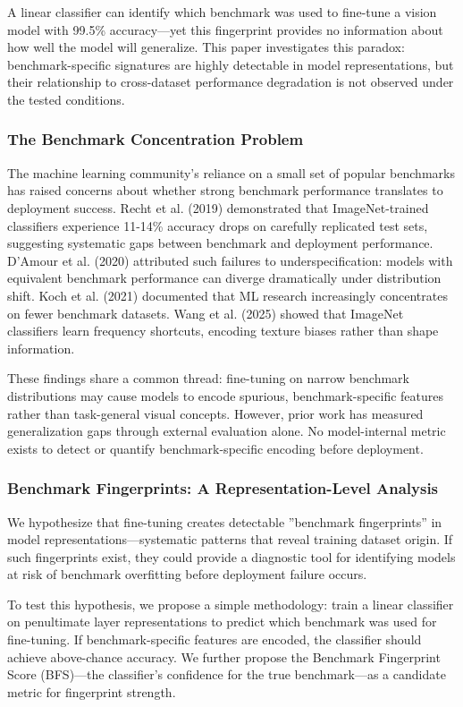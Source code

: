 
A linear classifier can identify which benchmark was used to fine-tune a vision model with 99.5\% accuracy---yet this fingerprint provides no information about how well the model will generalize. This paper investigates this paradox: benchmark-specific signatures are highly detectable in model representations, but their relationship to cross-dataset performance degradation is not observed under the tested conditions.

\subsubsection{The Benchmark Concentration Problem}

The machine learning community's reliance on a small set of popular benchmarks has raised concerns about whether strong benchmark performance translates to deployment success. Recht et al. (2019) demonstrated that ImageNet-trained classifiers experience 11-14\% accuracy drops on carefully replicated test sets, suggesting systematic gaps between benchmark and deployment performance. D'Amour et al. (2020) attributed such failures to underspecification: models with equivalent benchmark performance can diverge dramatically under distribution shift. Koch et al. (2021) documented that ML research increasingly concentrates on fewer benchmark datasets. Wang et al. (2025) showed that ImageNet classifiers learn frequency shortcuts, encoding texture biases rather than shape information.

These findings share a common thread: fine-tuning on narrow benchmark distributions may cause models to encode spurious, benchmark-specific features rather than task-general visual concepts. However, prior work has measured generalization gaps through external evaluation alone. No model-internal metric exists to detect or quantify benchmark-specific encoding before deployment.

\subsubsection{Benchmark Fingerprints: A Representation-Level Analysis}

We hypothesize that fine-tuning creates detectable ''benchmark fingerprints'' in model representations---systematic patterns that reveal training dataset origin. If such fingerprints exist, they could provide a diagnostic tool for identifying models at risk of benchmark overfitting before deployment failure occurs.

To test this hypothesis, we propose a simple methodology: train a linear classifier on penultimate layer representations to predict which benchmark was used for fine-tuning. If benchmark-specific features are encoded, the classifier should achieve above-chance accuracy. We further propose the Benchmark Fingerprint Score (BFS)---the classifier's confidence for the true benchmark---as a candidate metric for fingerprint strength.

